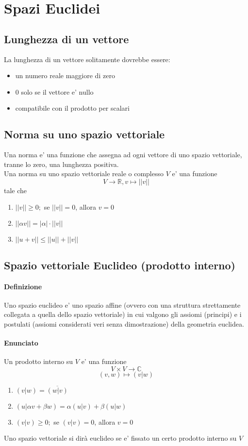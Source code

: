\documentclass[a4paper, 10pt]{article}
\begin{document}
	\newpage
	\section{Spazi Euclidei}
	\subsection{Lunghezza di un vettore}
	La lunghezza di un vettore solitamente dovrebbe essere:
	\begin{itemize}
		\item un numero reale maggiore di zero
		\item 0 solo se il vettore e' nullo
		\item compatibile con il prodotto per scalari
	\end{itemize}
	
	\subsection{Norma su uno spazio vettoriale}
	Una norma e' una funzione che assegna ad ogni vettore di uno spazio vettoriale, tranne lo zero, una lunghezza positiva.\\
	Una norma su uno spazio vettoriale reale o complesso $V$ e' una funzione 
	\[ V \rightarrow \mathbb{R}, v \longmapsto \vert \vert v \vert \vert \] tale che 
	\begin{enumerate}
		\item $||v|| \geq 0;$ se $||v|| = 0$, allora $v = 0$
		\item $||\alpha v|| = |\alpha| \cdot ||v||$
		\item $||u + v|| \leq ||u|| + ||v||$
	\end{enumerate}
	
	\subsection{Spazio vettoriale Euclideo (prodotto interno)}
	\paragraph*{Definizione}
	Uno spazio euclideo e' uno spazio affine (ovvero con una struttura strettamente collegata a quella dello 
	spazio vettoriale) in cui valgono gli assiomi (principi) e i postulati (assiomi considerati veri senza dimostrazione)
	della geometria euclidea.
	\paragraph*{Enunciato}
	Un prodotto interno su $V$ e' una funzione \[ V \times V \rightarrow \mathbb{C}\]\[ (v,w) \longmapsto (v | w)\]
	\begin{enumerate}
		\item $(v|w) = \overline{(w | v)}$
		\item $(u|\alpha v + \beta w) = \alpha(u | v) + \beta(u|w)$
		\item $(v|v) \geq 0;$ se $(v|v) = 0$, allora $v = 0$
	\end{enumerate}
	Uno spazio vettoriale si dirà euclideo se e' fissato un certo prodotto interno su $V$
\end{document}
